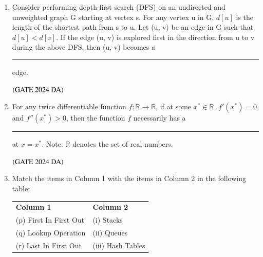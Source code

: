 \documentclass[journal,12pt,onecolumn]{IEEEtran}
\theoremstyle{remark}
\begin{document}
\begin{enumerate}[resume]
\item Consider performing depth-first search (DFS) on an undirected and unweighted graph G starting at vertex s. For any vertex u in G, $d[u]$ is the length of the shortest path from s to u. Let (u, v) be an edge in G such that $d[u] < d[v]$. If the edge (u, v) is explored first in the direction from u to v during the above DFS, then (u, v) becomes a  \rule{2cm}{0.5mm} edge.
\begin{enumerate}
\end{enumerate}
\hfill $\left(\text{GATE 2024 DA}\right)$


\item For any twice differentiable function $f: \mathbb{R} \to \mathbb{R}$, if at some $x^* \in \mathbb{R}$, $f'(x^*) = 0$ and $f''(x^*) > 0$, then the function $f$ necessarily has a  \rule{2cm}{0.5mm} at $x = x^*$.
Note: $\mathbb{R}$ denotes the set of real numbers.
\begin{enumerate}
\end{enumerate}
\hfill $\left(\text{GATE 2024 DA}\right)$


\item Match the items in Column 1 with the items in Column 2 in the following table:
\begin{center}
\begin{tabular}{ll}
\textbf{Column 1} & \textbf{Column 2} \\
(p) First In First Out & (i) Stacks \\
(q) Lookup Operation & (ii) Queues \\
(r) Last In First Out & (iii) Hash Tables \\
\end{tabular}
\end{center}
\begin{multicols}{2}
\begin{enumerate}


\end{enumerate}
\end{multicols}
\end{enumerate}
\end{document}
